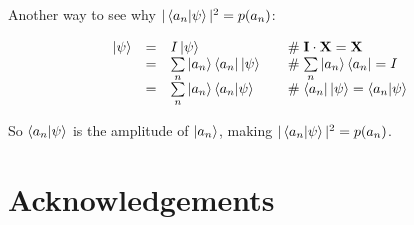 \documentclass[11pt, oneside]{article}   	%
\begin{document}
\bigskip
\noindent
Another way to see why $|\braket{a_n | \psi}|^2 = p(a_n)$:


\begin{equation*}
\begin{array}{rcll}
\ket{\psi}
&=& I \ket{\psi}                                                                                                   & \quad \mathrel{\#}  \mathbf{I} \cdot \mathbf{X} = \mathbf{X} \\
&=& \sum\limits_{n} \ket{a_n} \bra{a_n} \ket{\psi}                                              & \quad \mathrel{\#} \sum\limits_{n} \ket{a_n} \bra{a_n} = I \\
&=& \sum\limits_{n} \ket{a_n} \braket{a_n | \psi}                                               & \quad \mathrel{\#} \bra{a_n} \ket{\psi} = \braket{a_n | \psi} 
\end{array}
\end{equation*}

\bigskip
\noindent
So $\braket{a_n | \psi}$ is the amplitude of $\ket{a_n}$, making $| \braket{a_n | \psi} |^2 = p(a_n)$.

\bigskip
\section{Acknowledgements}

\newpage


\end{document}
